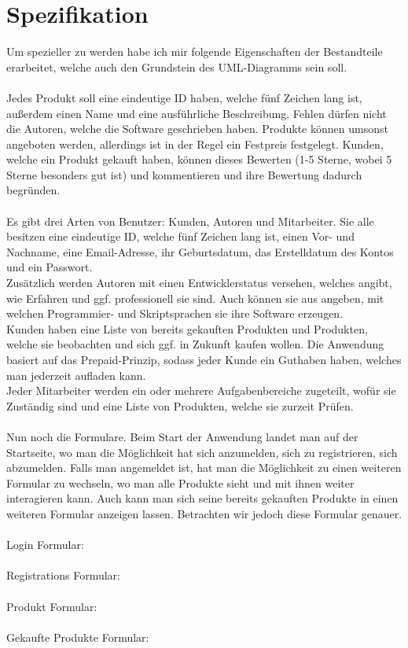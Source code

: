\section{Spezifikation}
Um spezieller zu werden habe ich mir folgende Eigenschaften der Bestandteile erarbeitet, welche auch den Grundstein des UML-Diagramms sein soll.\\
\\
Jedes Produkt soll eine eindeutige ID haben, welche fünf Zeichen lang ist, außerdem einen Name und eine ausführliche Beschreibung. Fehlen dürfen nicht die Autoren, welche die Software geschrieben haben. Produkte können umsonst angeboten werden, allerdings ist in der Regel ein Festpreis festgelegt. Kunden, welche ein Produkt gekauft haben, können dieses Bewerten (1-5 Sterne, wobei 5 Sterne besonders gut ist) und kommentieren und ihre Bewertung dadurch begründen.\\
\\
Es gibt drei Arten von Benutzer: Kunden, Autoren und Mitarbeiter. Sie alle besitzen eine eindeutige ID, welche fünf Zeichen lang ist, einen Vor- und Nachname, eine Email-Adresse, ihr Geburtsdatum, das Erstelldatum des Kontos und ein Passwort.\\
Zusätzlich werden Autoren mit einen Entwicklerstatus versehen, welches angibt, wie Erfahren und ggf. professionell sie sind. Auch können sie aus angeben, mit welchen Programmier- und Skriptsprachen sie ihre Software erzeugen.\\
Kunden haben eine Liste von bereits gekauften Produkten und Produkten, welche sie beobachten und sich ggf. in Zukunft kaufen wollen. Die Anwendung basiert auf das Prepaid-Prinzip, sodass jeder Kunde ein Guthaben haben, welches man jederzeit aufladen kann.\\
Jeder Mitarbeiter werden ein oder mehrere Aufgabenbereiche zugeteilt, wofür sie Zuständig sind und eine Liste von Produkten, welche sie zurzeit Prüfen.\\
\\
Nun noch die Formulare. Beim Start der Anwendung landet man auf der Startseite, wo man die Möglichkeit hat sich anzumelden, sich zu registrieren, sich abzumelden. Falls man angemeldet ist, hat man die Möglichkeit zu einen weiteren Formular zu wechseln, wo man alle Produkte sieht und mit ihnen weiter interagieren kann. Auch kann man sich seine bereits gekauften Produkte in einen weiteren Formular anzeigen lassen. Betrachten wir jedoch diese Formular genauer.\\
\\
Login Formular:\\
\\
Registrations Formular:\\
\\
Produkt Formular:\\
\\
Gekaufte Produkte Formular:\\
\\
